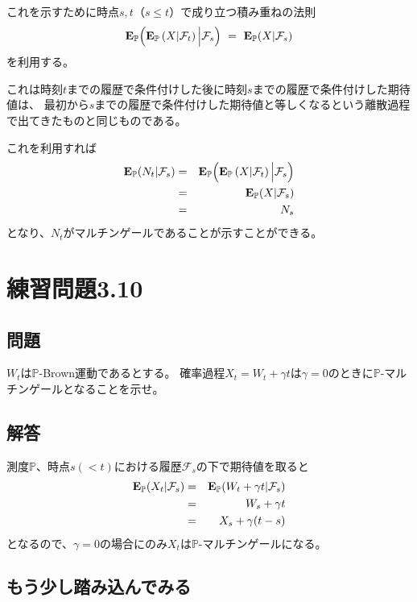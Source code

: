 \documentclass[uplatex,a4j,12pt,dvipdfmx]{jsarticle}
\begin{document}
${}$

これを示すために時点$s,t$（$s \leq t$）で成り立つ積み重ねの法則
$$
	{\bf E}_{\mathbb{P}}
	\Big(
	{\bf E}_{\mathbb{P}}
	\left(
	X | \mathcal{F}_{t}
	\right)
	\Big| \mathcal{F}_{s} \Big)
	\ = \
	{\bf E}_{\mathbb{P}}( X | \mathcal{F}_{s} )
$$
を利用する。

これは時刻$t$までの履歴で条件付けした後に時刻$s$までの履歴で条件付けした期待値は、
最初から$s$までの履歴で条件付けした期待値と等しくなるという離散過程で出てきたものと同じものである。

これを利用すれば
%
\begin{eqnarray*}
	{\bf E}_{\mathbb{P}}( N_{t} | \mathcal{F}_{s} )
	&=&
	{\bf E}_{\mathbb{P}}
	\Big(
	{\bf E}_{\mathbb{P}}
	\left(
	X | \mathcal{F}_{t}
	\right)
	\Big| \mathcal{F}_{s} \Big)
	\\ &=&
	{\bf E}_{\mathbb{P}}( X | \mathcal{F}_{s} )
	\\ &=&
	N_{s}
\end{eqnarray*}
%
となり、$N_{t}$がマルチンゲールであることが示すことができる。

\section{練習問題3.10}

\subsection{問題}

$W_{t}$は$\mathbb{P}$-Brown運動であるとする。
確率過程$X_{t}=W_{t} + \gamma t$は$\gamma=0$のときに$\mathbb{P}$-マルチンゲールとなることを示せ。

\subsection{解答}

測度$\mathbb{P}$、時点$s(<t)$における履歴$\mathcal{F}_{s}$の下で期待値を取ると
%
\begin{eqnarray*}
	{\bf E}_{\mathbb{P}}( X_{t} | \mathcal{F}_{s} )
	&=&
	{\bf E}_{\mathbb{P}}( W_{t} + \gamma t | \mathcal{F}_{s} )
	\\ &=&
	W_{s}+ \gamma t
	\\ &=&
	X_{s} + \gamma  ( t - s )
\end{eqnarray*}
%
となるので、$\gamma = 0$の場合にのみ$X_{t}$は$\mathbb{P}$-マルチンゲールになる。
\subsection{もう少し踏み込んでみる}
\end{document}
